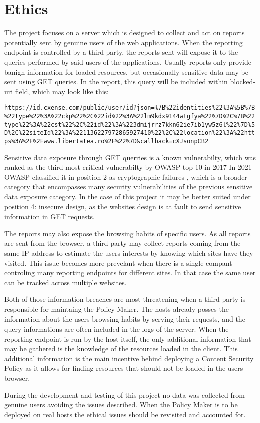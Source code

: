 \section{Ethics}
The project focuses on a server which is designed to collect and act on reports potentially sent by genuine users of the web applications. 
When the reporting endpoint is controlled by a third party, the reports sent will expose it to the queries performed by said users of the applications.
Usually reports only provide banign information for loaded resources, but occasionally sensitive data may be sent using GET queries.
In the report, this query will be included within blocked-uri field, which may look like this:
\begin{verbatim}
https://id.cxense.com/public/user/id?json=%7B%22identities%22%3A%5B%7B
%22type%22%3A%22ckp%22%2C%22id%22%3A%22lm9kdx9144wtgfya%22%7D%2C%7B%22
type%22%3A%22cst%22%2C%22id%22%3A%223dmijrrz7kkn62ie7ib1yw5z6l%22%7D%5
D%2C%22siteId%22%3A%221136227972865927410%22%2C%22location%22%3A%22htt
ps%3A%2F%2Fwww.libertatea.ro%2F%22%7D&callback=cXJsonpCB2
\end{verbatim}
Sensitive data exposure through GET querries is a known vulnerabilty, which was ranked as the third most critical vulnerabilty by OWASP top 10 in 2017 \cite{owaspTop102017}
In 2021 OWASP classified it in position 2 as cryptographic failures \cite{owaspTop10}, which is a broader category that encompasses many security vulnerabilities of the previous sensitive data exposure category. 
In the case of this project it may be better suited under position 4: insecure design, as the websites design is at fault to send sensitive information in GET requests. 

The reports may also expose the browsing habits of specific users. 
As all reports are sent from the browser, a third party may collect reports coming from the same IP address to estimate the users interests by knowing which sites have they visited. 
This issue becomes more prevelant when there is a single compant controling many reporting endpoints for different sites.
In that case the same user can be tracked across multiple websites.

Both of those information breaches are most threatening when a third party is responsible for maintaing the Policy Maker.
The hosts already posses the information about the users browsing habits by serving their requests, and the query informations are often included in the logs of the server.
When the reporting endpoint is run by the host itself, the only additional information that may be gathered is the knowledge of the resources loaded in the client. 
This additional information is the main incentive behind deploying a Content Security Policy as it allows for finding resources that should not be loaded in the users browser.

During the development and testing of this project no data was collected from genuine users avoiding the issues described.
When the Policy Maker is to be deployed on real hosts the ethical issues should be revisited and accounted for.

